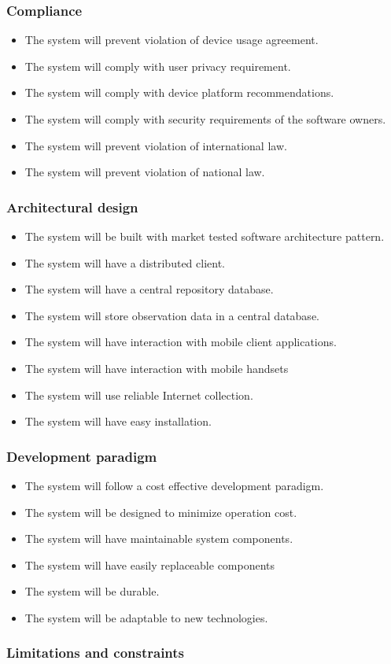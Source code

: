 \subsubsection{Compliance}
		\begin{itemize}
		     \item The system will prevent violation of device usage agreement.
             \item The system will comply with user privacy requirement.
             \item The system will comply with device platform recommendations.
             \item The system will comply with security requirements of the software owners.
             \item The system will prevent violation of international law.
             \item The system will prevent violation of national law.

	    \end{itemize}
\subsubsection{Architectural design}
    \begin{itemize}
        \item The system will be built with market tested software architecture pattern.
        \item The system will have a distributed client.
        \item The system will have a central repository database.
        \item The system will store observation data in a central database.
        \item The system will have interaction with mobile client applications.
        \item The system will have interaction with mobile handsets
        \item The system will use reliable Internet collection.
        \item The system will have easy installation.

    \end{itemize}
\subsubsection{Development paradigm}
    \begin{itemize}
        \item The system will follow a cost effective development paradigm.
        \item The system will be designed to minimize operation cost.
        \item The system will have maintainable system components.
        \item The system will have easily replaceable components
        \item The system will be durable.
        \item The system will be adaptable to new technologies.

    \end{itemize}
\subsubsection{Limitations and constraints}
